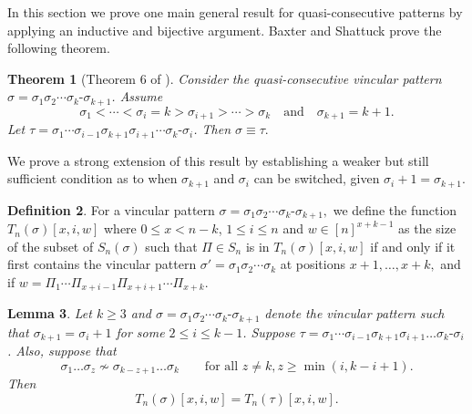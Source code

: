 \documentclass[11pt]{amsart}
\newtheorem{theorem}{Theorem}[section]
\newtheorem{lemma}[theorem]{Lemma}
\theoremstyle{definition}
\newtheorem{defn}[theorem]{Definition}
\begin{document}
In this section we prove one main general result for quasi-consecutive patterns by applying an inductive and bijective argument.  Baxter and Shattuck \cite{BaxterShattuckMainPaper} prove the following theorem.

\begin{theorem}[Theorem 6 of \cite{BaxterShattuckMainPaper}]
	\label{thm:BaxterShattuckThm6}
	Consider the quasi-consecutive vincular pattern 
	$\sigma = \sigma_1\sigma_2\cdots\sigma_{k} {\text{-}} \sigma_{k+1}$. 
	Assume \[ \sigma_1<\cdots<\sigma_i = k > \sigma_{i+1}>\cdots>\sigma_k
	\quad\text{and}\quad \sigma_{k+1} = k+1. \]
	Let $\tau = \sigma_1\cdots\sigma_{i-1}\sigma_{k+1}\sigma_{i+1}\cdots\sigma_k{\text{-}}\sigma_i$.
	Then $\sigma \equiv \tau.$
\end{theorem}

We prove a strong extension of this result by establishing a weaker but still sufficient condition as to when $\sigma_{k+1}$ and $\sigma_i$ can be switched, given $\sigma_i + 1 = \sigma_{k+1}.$

\begin{defn}
    For a vincular pattern $\sigma = \sigma_1\sigma_2\cdots\sigma_{k}{\text{-}}\sigma_{k+1},$ we define the function $T_n(\sigma)[x, i, w]$ where $0 \le x < n-k$, $1 \le i \le n$ and $w \in [n]^{x+k-1}$ as the size of the subset of $S_n(\sigma)$ such that $\Pi \in S_n$ is in $T_n(\sigma)[x, i, w]$ if and only if it first contains the vincular pattern $\sigma' = \sigma_1\sigma_2\cdots\sigma_{k}$ at positions $x+1, \dots, x+k,$ and if $w = \Pi_1\cdots\Pi_{x+i-1}\Pi_{x+i+1}\cdots\Pi_{x+k}.$
\end{defn}

\begin{lemma}
	\label{lem:meow}
    Let $k \ge 3$ and $\sigma = \sigma_1\sigma_2\cdots\sigma_{k}{\text{-}}\sigma_{k+1}$
	denote the vincular pattern such that $\sigma_{k+1} = \sigma_i + 1$
	for some $2 \le i \le k-1$.
	Suppose $\tau = \sigma_1\cdots\sigma_{i-1}\sigma_{k+1}\sigma_{i+1}\dots\sigma_k{\text{-}}\sigma_i$.
	Also, suppose that
	\[ \sigma_1\dots\sigma_z \not\sim \sigma_{k-z+1}\dots\sigma_k
		\qquad \text{for all } z \neq k, z \ge \min(i, k-i+1). \] 
	Then
	\[ T_n(\sigma)[x, i, w] = T_n(\tau)[x, i, w]. \]
    
    
    
        
        
    
\end{lemma}
\end{document}

